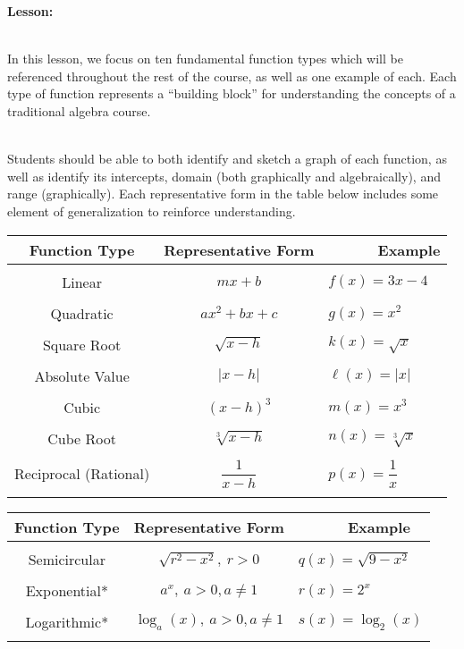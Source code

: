 \documentclass[12pt]{article}
\theoremstyle{definition}
\begin{document}
{\bf Lesson:}\\
\ \par
In this lesson, we focus on ten fundamental function types which will be referenced throughout the rest of the course, as well as one example of each.  Each type of function represents a ``building block'' for understanding the concepts of a traditional algebra course.\\
\ \par
Students should be able to both identify and sketch a graph of each function, as well as identify its intercepts, domain (both graphically and algebraically), and range (graphically).  Each representative form in the table below includes some element of generalization to reinforce understanding.
\begin{center}
\begin{tabular}{|c|c|l|}
\hline
Function Type & Representative Form & ~~~~~~Example\\
\hline
&&\\
Linear & $mx+b$ & $f(x)=3x-4$\\
&&\\
Quadratic & $ax^2+bx+c$ & $g(x)=x^2$\\
&&\\
Square Root & $\sqrt{x-h}$ & $k(x)=\sqrt{x}$\\
&&\\
Absolute Value & $|x-h|$ & $\ell(x)=|x|$\\
&&\\
Cubic & $(x-h)^3$ & $m(x)=x^3$\\
&&\\
Cube Root & $\sqrt[3]{x-h}$ & $n(x)=\sqrt[3]{x}$\\
&&\\
Reciprocal (Rational) & $\dfrac{1}{x-h}$ & $p(x)=\dfrac{1}{x}$\\
&&\\
\hline
\end{tabular}
\newpage
\begin{tabular}{|c|c|l|}
\hline
Function Type & Representative Form & ~~~~~~Example\\
\hline
&&\\
Semicircular & $\sqrt{r^2-x^2},~r>0$ & $q(x)=\sqrt{9-x^2}$\\
&&\\
Exponential* & $a^x,~a>0, a\neq 1$ & $r(x)=2^x$\\
&&\\
Logarithmic* & $\log_a(x),~a>0, a\neq1$ & $s(x)=\log_2(x)$\\
&&\\
\hline
\end{tabular}
\end{center}
\end{document}
